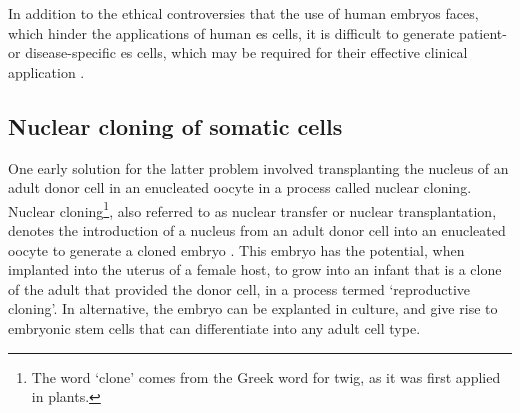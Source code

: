 






In addition to the ethical controversies that the use of human embryos faces, which hinder the applications of human \gls{es} cells,
it is difficult to generate patient- or disease-specific \gls{es} cells, which may be required for their effective clinical application \cite{yamanaka2007strategies}.


\subsection{Nuclear cloning of somatic cells}
\label{sec:cloning} 
One early solution for the latter problem involved transplanting the nucleus of an adult donor cell in an enucleated oocyte in a process called nuclear cloning. \\

Nuclear cloning\footnote{The word `clone' comes from the Greek word for twig, as it was first applied in plants.}, also referred to as nuclear transfer or nuclear transplantation, denotes the introduction of a nucleus from an adult donor cell into an enucleated oocyte to generate a cloned embryo \cite{hochedlinger2003nuclear}.
This embryo has the potential, when implanted into the uterus of a female host, to grow into an infant that is a clone of the adult that provided the donor cell, in a process termed `reproductive cloning'. 
In alternative, the embryo can be explanted in culture, and give rise to embryonic stem cells that can differentiate into any adult cell type.\\

